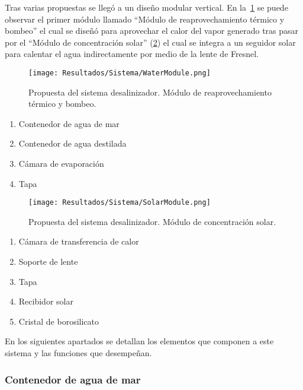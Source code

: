 			Tras varias propuestas se llegó a un diseño modular vertical. En la~\cref{fig:WaterModule} se puede observar el primer módulo llamado ``Módulo de reaprovechamiento térmico y bombeo'' el cual se diseñó para aprovechar el calor del vapor generado tras pasar por el ``Módulo de concentración solar'' (\cref{fig:SolarModule}) el cual se integra a un seguidor solar para calentar el agua indirectamente por medio de la lente de Fresnel.
		
		
			\begin{figure}[H]
				\centering
				\texttt{[image: Resultados/Sistema/WaterModule.png]}
				\caption{Propuesta del sistema desalinizador. Módulo de reaprovechamiento térmico y bombeo.}
				\label{fig:WaterModule}
			\end{figure}
			
			\begin{enumerate}[columns=2]
				\item Contenedor de agua de mar
				\item Contenedor de agua destilada
				\item Cámara de evaporación
				\item Tapa
			\end{enumerate}
			
			\begin{figure}[H]
				\centering
				\texttt{[image: Resultados/Sistema/SolarModule.png]}
				\caption{Propuesta del sistema desalinizador. Módulo de concentración solar.}
				\label{fig:SolarModule}
			\end{figure}
			
			\begin{enumerate}[columns=2]
				\item Cámara de transferencia de calor
				\item Soporte de lente
				\item Tapa
				\item Recibidor solar
				\item Cristal de borosilicato
			\end{enumerate}
			
			En los siguientes apartados se detallan los elementos que componen a este sistema y las funciones que desempeñan.
	
			\subsubsection{Contenedor de agua de mar}
				
